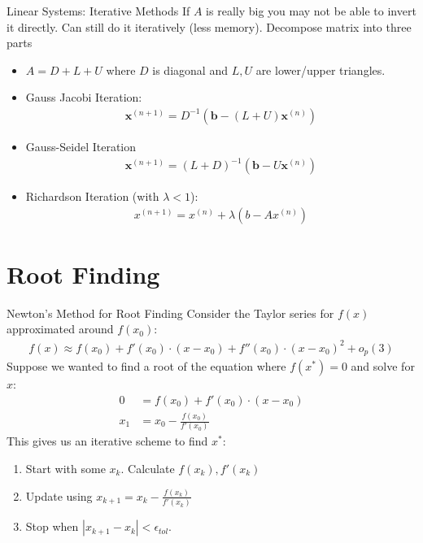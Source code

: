 \documentclass[xcolor=pdftex,dvipsnames,table,mathserif,aspectratio=169]{beamer}
\begin{document}
\begin{frame}{Linear Systems: Iterative Methods}
If $A$ is really big you may not be able to invert it directly. Can still do it iteratively (less memory). Decompose matrix into three parts
\begin{itemize}
\item $A = D + L + U$ where $D$ is diagonal and $L,U$ are lower/upper triangles.
\item Gauss Jacobi Iteration:
\begin{align*}
\mathbf{x}^{(n+1)}=D^{-1}\left(\mathbf{b}-(L+U) \mathbf{x}^{(n)}\right)
\end{align*}
\item Gauss-Seidel Iteration
\begin{align*}
\mathbf{x}^{(n+1)}=(L+D)^{-1}\left(\mathbf{b}-U \mathbf{x}^{(n)}\right)
\end{align*}
\item Richardson Iteration (with $\lambda < 1$):
\begin{align*}
x^{(n+1)}=x^{(n)}+\lambda \left(b-A x^{(n)}\right)
\end{align*}
\end{itemize}
\end{frame}





\section{Root Finding} 

\begin{frame}{Newton's Method for Root Finding}
Consider the Taylor series for $f(x)$ approximated around $f(x_0)$:
\begin{align*}
f(x) \approx f(x_0) + f'(x_0) \cdot (x-x_0) + f''(x_0) \cdot (x-x_0)^2 + o_p(3)
\end{align*}
Suppose we wanted to find a \alert{root} of the equation where $f(x^{*})=0$ and solve for $x$:
\begin{align*}
0 &= f(x_0) + f'(x_0) \cdot (x-x_0) \\
x_1 &= x_0-\frac{f(x_0)}{f'(x_0)} 
\end{align*}
This gives us an \alert{iterative} scheme to find $x^{*}$:
\begin{enumerate}
\item Start with some $x_k$. Calculate $f(x_k),f'(x_k)$
\item Update using $x_{k+1} = x_k - \frac{f(x_k)}{f'(x_k)} $
\item Stop when $|x_{k+1}-x_{k}| < \epsilon_{tol}$.
\end{enumerate}
\end{frame}
\end{document}
